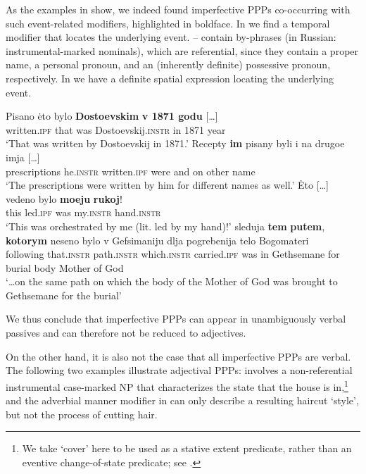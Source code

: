 \documentclass[output=paper,
modfonts,
newtxmath,
hidelinks
]{langscibook}
\begin{document}
As the examples in  show, we indeed found imperfective PPPs co-occurring with such event-related modifiers, highlighted in boldface. In  we find a temporal modifier that locates the underlying event. -- contain by-phrases (in Russian: instrumental-marked nominals), which are referential, since they contain a proper name, a personal pronoun, and an (inherently definite) possessive pronoun, respectively. In  we have a definite spatial expression locating the underlying event.

\ea\label{pisano}
\ea\gll	Pisano \.{e}to bylo \textbf{Dostoevskim} \textbf{v 1871 godu} [\dots]\\ 
	written.\textsc{ipf} that was Dostoevskij.\textsc{instr} {in 1871 year} \\
\glt	`That was written by Dostoevskij in 1871.'\label{pisanodost}
\ex\gll	Recepty \textbf{im} pisany byli i na drugoe imja [\dots]\\ 
	prescriptions he.\textsc{instr} written.\textsc{ipf} were and on other name \\ 
\glt	`The prescriptions were written by him for different names as well.'\label{pisanoim}
\ex\gll 	\.{E}to [\dots] vedeno bylo \textbf{moeju} \textbf{rukoj}!\\
	this {} led.\textsc{ipf} was my.\textsc{instr} hand.\textsc{instr}\\
\glt	`This was orchestrated by me (lit. led by my hand)!'\label{vedeno} 
\ex\gll	[\dots] sleduja \textbf{tem} \textbf{putem}, \textbf{kotorym} neseno bylo v Gefsimaniju dlja pogrebenija telo Bogomateri\\
	{} following that.\textsc{instr} path.\textsc{instr} which.\textsc{instr} carried.\textsc{ipf} was in Gethsemane for burial body {Mother of God} \\
\glt	`\dots on the same path on which the body of the Mother of God was brought to Gethsemane for the burial'\label{Sion}
\z\z

\noindent We thus conclude that imperfective PPPs can appear in unambiguously verbal passives and can therefore not be reduced to adjectives. 

On the other hand, it is also not the case that all imperfective PPPs are verbal. The following two examples illustrate adjectival PPPs:  involves a non-referential instrumental case-marked NP that characterizes the state that the house is in,\footnote{We take `cover' here to be used as a stative extent predicate, rather than an eventive change-of-state predicate; see \citet{gawron09}.} and the adverbial manner modifier in  can only describe a resulting haircut `style', but not the process of cutting hair.
\end{document}
